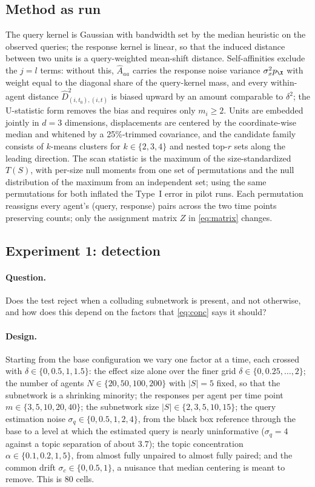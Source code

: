 \subsection{Method as run}
\label{sec:sim-method}

The query kernel is Gaussian with bandwidth set by the median heuristic on the observed queries; the response kernel is linear, so that the induced distance between two units is a query-weighted mean-shift distance. Self-affinities exclude the $j=l$ terms: without this, $\hat A_{aa}$ carries the response noise variance $\sigma_x^2 p_\X$ with weight equal to the diagonal share of the query-kernel mass, and every within-agent distance $\hat D^2_{(i,t_0),(i,t)}$ is biased upward by an amount comparable to $\delta^2$; the U-statistic form removes the bias and requires only $m_i\ge 2$. Units are embedded jointly in $d=3$ dimensions, displacements are centered by the coordinate-wise median and whitened by a 25\%-trimmed covariance, and the candidate family consists of $k$-means clusters for $k\in\{2,3,4\}$ and nested top-$r$ sets along the leading direction. The scan statistic is the maximum of the size-standardized $T(S)$, with per-size null moments from one set of permutations and the null distribution of the maximum from an independent set; using the same permutations for both inflated the Type~I error in pilot runs. Each permutation reassigns every agent's (query, response) pairs across the two time points preserving counts; only the assignment matrix $Z$ in \eqref{eq:matrix} changes.

\subsection{Experiment 1: detection}
\label{sec:exp-detect}

\paragraph{Question.} Does the test reject when a colluding subnetwork is present, and not otherwise, and how does this depend on the factors that \eqref{eq:conc} says it should?

\paragraph{Design.} Starting from the base configuration we vary one factor at a time, each crossed with $\delta\in\{0,0.5,1,1.5\}$: the effect size alone over the finer grid $\delta\in\{0,0.25,\dots,2\}$; the number of agents $N\in\{20,50,100,200\}$ with $|S|=5$ fixed, so that the subnetwork is a shrinking minority; the responses per agent per time point $m\in\{3,5,10,20,40\}$; the subnetwork size $|S|\in\{2,3,5,10,15\}$; the query estimation noise $\sigma_q\in\{0,0.5,1,2,4\}$, from the black box reference through the base to a level at which the estimated query is nearly uninformative ($\sigma_q=4$ against a topic separation of about $3.7$); the topic concentration $\alpha\in\{0.1,0.2,1,5\}$, from almost fully unpaired to almost fully paired; and the common drift $\sigma_c\in\{0,0.5,1\}$, a nuisance that median centering is meant to remove. This is $80$ cells.

